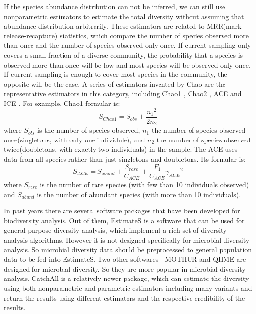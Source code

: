 If the species abundance distribution can not be inferred, we can still use
nonparametric estimators to estimate the total diversity without assuming that
abundance distribution arbitrarily. These estimators are related to
MRR(mark-release-recapture) statistics, which compare the number of species
observed more than once and the number of species observed only once. If
current sampling only covers a small fraction of a diverse community, the
probability that a species is observed more than once will be low and most
species will be observed only once. If current sampling is enough to cover most
species in the community, the opposite will be the case. A series of estimators
invented by Chao are the representative estimators in this category, including
Chao1 \cite{chao1984nonparametric}, Chao2 \cite{Chao:1987aa}, ACE
\cite{chao1993stopping} and ICE \cite{lee1994estimating}. For example, Chao1
formular is:\\ $${S}_{Chao1}={S}_{obs}+\frac{{{n}_{1}}^{2}}{2{n}_{2}}$$ where
${S}_{obs}$ is the number of species observed, ${n}_{1}$ the number of species
observed once(singletons, with only one individule), and ${n}_{2}$ the number
of species observed twice(doubletons, with exactly two individuals) in the
sample. The ACE uses data from all species rather than just singletons and
doubletons. Its formular is:\\
$${S}_{ACE}={S}_{abund}+\frac{{S}_{rare}}{{C}_{ACE}}+\frac{{F}_{1}}{{C}_{ACE}}{
{\gamma }_{ACE}}^{2}$$ where ${S}_{rare}$ is the number of rare species (with
few than 10 individuals observed) and ${S}_{abund}$ is the number of abundant
species (with more than 10 individuals).

In past years there are several software packages that have been developed for
biodiversity analysis. Out of them, EstimateS \cite{colwellestimates} is a
software that can be used for general purpose diversity analysis, which
implement a rich set of diversity analysis algorithms. However it is not
designed specifically for microbial diversity analysis. So microbial diversity
data should be preprocessed to general population data to be fed into
EstimateS. Two other softwares - MOTHUR \cite{Schloss:2009aa} and QIIME
\cite{Caporaso:2010aa} are designed for microbial diversity. So they are more
popular in microbial diversity analysis. CatchAll \cite{Bunge:2011aa} is a
relatively newer package, which can estimate the diversity using both
nonparametric and parametric estimators including many variants and return the
results using different estimators and the respective credibility of the
results.


